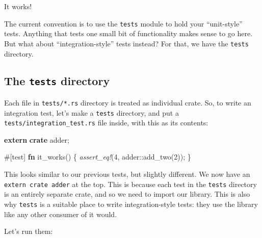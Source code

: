 \documentclass[a4paper,]{book}
\newenvironment{Shaded}{\begin{snugshade}}{\end{snugshade}}
\newcommand{\KeywordTok}[1]{\textcolor[rgb]{0.13,0.29,0.53}{\textbf{{#1}}}}
\newcommand{\DecValTok}[1]{\textcolor[rgb]{0.00,0.00,0.81}{{#1}}}
\newcommand{\PreprocessorTok}[1]{\textcolor[rgb]{0.56,0.35,0.01}{\textit{{#1}}}}
\newcommand{\AttributeTok}[1]{\textcolor[rgb]{0.77,0.63,0.00}{{#1}}}
\newcommand{\NormalTok}[1]{{#1}}
\begin{document}
It works!

The current convention is to use the \texttt{tests} module to hold your
``unit-style'' tests. Anything that tests one small bit of functionality
makes sense to go here. But what about ``integration-style'' tests
instead? For that, we have the \texttt{tests} directory.

\subsection{\texorpdfstring{The \texttt{tests}
directory}{The tests directory}}\label{the-tests-directory}

Each file in \texttt{tests/*.rs} directory is treated as individual
crate. So, to write an integration test, let's make a \texttt{tests}
directory, and put a \texttt{tests/integration\_test.rs} file inside,
with this as its contents:

\begin{Shaded}
\begin{Highlighting}[]
\KeywordTok{extern} \KeywordTok{crate} \NormalTok{adder;}

\AttributeTok{#[}\NormalTok{test}\AttributeTok{]}
\KeywordTok{fn} \NormalTok{it_works() \{}
    \PreprocessorTok{assert_eq!}\NormalTok{(}\DecValTok{4}\NormalTok{, adder::add_two(}\DecValTok{2}\NormalTok{));}
\NormalTok{\}}
\end{Highlighting}
\end{Shaded}

This looks similar to our previous tests, but slightly different. We now
have an \texttt{extern\ crate\ adder} at the top. This is because each
test in the \texttt{tests} directory is an entirely separate crate, and
so we need to import our library. This is also why \texttt{tests} is a
suitable place to write integration-style tests: they use the library
like any other consumer of it would.

Let's run them:
\end{document}
